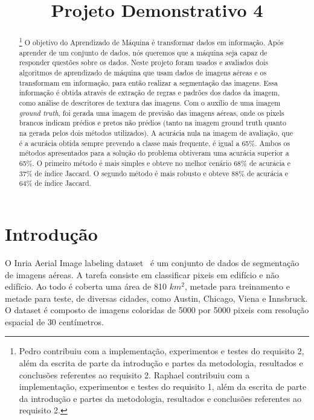 \documentclass{bmvc2k}
\title{Projeto Demonstrativo 4}
\begin{document}
\begin{NoHyper}
\maketitle
\end{NoHyper}

\begin{abstract}
\footnote{Pedro contribuiu com a implementação, experimentos e testes do requisito 2, além da escrita de parte da introdução e partes da metodologia, resultados e conclusões referentes ao requisito 2. Raphael contribuiu com a implementação, experimentos e testes do requisito 1, além da escrita de parte da introdução e partes da metodologia, resultados e conclusões referentes ao requisito 2.} O objetivo do Aprendizado de Máquina é transformar dados em informação. Após aprender de um conjunto de dados, nós queremos que a máquina seja capaz de responder questões sobre os dados. Neste projeto foram usados e avaliados dois algoritmos de aprendizado de máquina que usam dados de imagens aéreas e os transformam em informação, para então realizar a segmentação das imagens. Essa informação é obtida através de extração de regras e padrões dos dados da imagem, como análise de descritores de textura das imagens. Com o auxílio de uma imagem \textit{ground truth}, foi gerada uma imagem de previsão das imagens aéreas, onde os pixels brancos indicam prédios e pretos não prédios (tanto na imagem ground truth quanto na gerada pelos dois métodos utilizados). A acurácia nula na imagem de avaliação, que é a acurácia obtida sempre prevendo a classe mais frequente, é igual a 65\%. Ambos os métodos apresentados para a solução do problema obtiveram uma acurácia superior a 65\%. O primeiro método é mais simples e obteve no melhor cenário 68\% de acurácia e 37\% de índice Jaccard. O segundo método é mais robusto e obteve 88\% de acurácia e 64\% de índice Jaccard. 
\end{abstract}

\section{Introdução}
\label{sec:intro}


O Inria Aerial Image labeling dataset~\cite{maggiori2017dataset} é um conjunto de dados de segmentação de imagens aéreas. A tarefa consiste em classificar pixeis em edifício e não edifício. Ao todo é coberta uma área de 810 $km^2$, metade para treinamento e metade para teste, de diversas cidades, como Austin, Chicago, Viena e Innsbruck. O dataset é composto de imagens coloridas de 5000 por 5000 pixeis com resolução espacial de 30 centímetros.
\end{document}
